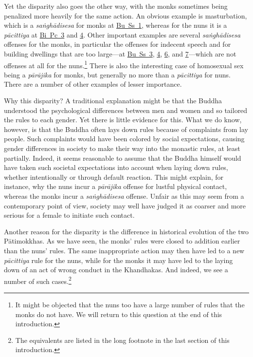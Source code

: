 \documentclass[12pt,openany]{book}%
\begin{document}
Yet the disparity also goes the other way, with the monks sometimes being penalized more heavily for the same action. An obvious example is masturbation, which is a \textit{\textsanskrit{saṅghādisesa}} for monks at \href{https://suttacentral.net/pli-tv-bu-vb-ss1/en/brahmali\#2.1.13.1}{Bu~Ss~1}, whereas for the nuns it is a \textit{\textsanskrit{pācittiya}} at \href{https://suttacentral.net/pli-tv-bi-vb-pc3/en/brahmali\#1.14.1}{Bi~Pc~3} and \href{https://suttacentral.net/pli-tv-bi-vb-pc4/en/brahmali\#1.21.1}{4}. Other important examples are several \textit{\textsanskrit{saṅghādisesa}} offenses for the monks, in particular the offenses for indecent speech and for building dwellings that are too large—at \href{https://suttacentral.net/pli-tv-bu-vb-ss3/en/brahmali\#1.2.14.1}{Bu~Ss~3}, \href{https://suttacentral.net/pli-tv-bu-vb-ss4/en/brahmali\#1.2.19.1}{4}, \href{https://suttacentral.net/pli-tv-bu-vb-ss6/en/brahmali\#1.6.6.1}{6}, and \href{https://suttacentral.net/pli-tv-bu-vb-ss7/en/brahmali\#1.19.1}{7}—which are not offenses at all for the nuns.\footnote{It might be objected that the nuns too have a large number of rules that the monks do not have. We will return to this question at the end of this introduction. } There is also the interesting case of homosexual sex being a \textit{\textsanskrit{pārājika}} for monks, but generally no more than a \textit{\textsanskrit{pācittiya}} for nuns. There are a number of other examples of lesser importance.

Why this disparity? A traditional explanation might be that the Buddha understood the psychological differences between men and women and so tailored the rules to each gender. Yet there is little evidence for this. What we do know, however, is that the Buddha often lays down rules because of complaints from lay people. Such complaints would have been colored by social expectations, causing gender differences in society to make their way into the monastic rules, at least partially. Indeed, it seems reasonable to assume that the Buddha himself would have taken such societal expectations into account when laying down rules, whether intentionally or through default reaction. This might explain, for instance, why the nuns incur a \textit{\textsanskrit{pārājika}} offense for lustful physical contact, whereas the monks incur a \textit{\textsanskrit{saṅghādisesa}} offense. Unfair as this may seem from a contemporary point of view, society may well have judged it as coarser and more serious for a female to initiate such contact.

Another reason for the disparity is the difference in historical evolution of the two \textsanskrit{Pātimokkhas}. As we have seen, the monks’ rules were closed to addition earlier than the nuns’ rules. The same inappropriate action may then have led to a new \textit{\textsanskrit{pācittiya}} rule for the nuns, while for the monks it may have led to the laying down of an act of wrong conduct in the Khandhakas. And indeed, we see a number of such cases.\footnote{The equivalents are listed in the long footnote in the last section of this introduction. }
\end{document}

